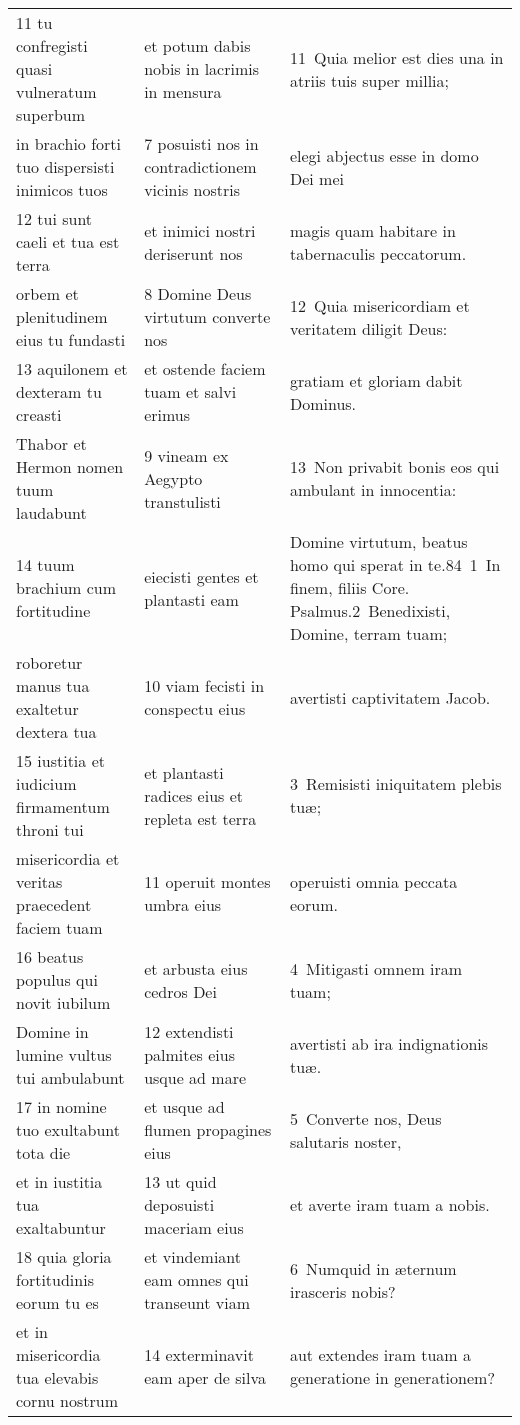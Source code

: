 \documentclass{article}
\begin{document}
\begin{longtable}{@{}p{}p{}p{}@{}}
11 tu confregisti quasi vulneratum superbum	&	et potum dabis nobis in lacrimis in mensura	&	11 Quia melior est dies una in atriis tuis super millia;	\\
in brachio forti tuo dispersisti inimicos tuos	&	7 posuisti nos in contradictionem vicinis nostris	&	elegi abjectus esse in domo Dei mei	\\
12 tui sunt caeli et tua est terra	&	et inimici nostri deriserunt nos	&	magis quam habitare in tabernaculis peccatorum.	\\
orbem et plenitudinem eius tu fundasti	&	8 Domine Deus virtutum converte nos	&	12 Quia misericordiam et veritatem diligit Deus:	\\
13 aquilonem et dexteram tu creasti	&	et ostende faciem tuam et salvi erimus	&	gratiam et gloriam dabit Dominus.	\\
Thabor et Hermon nomen tuum laudabunt	&	9 vineam ex Aegypto transtulisti	&	13 Non privabit bonis eos qui ambulant in innocentia:	\\
14 tuum brachium cum fortitudine	&	eiecisti gentes et plantasti eam	&	Domine virtutum, beatus homo qui sperat in te.84 1 In finem, filiis Core. Psalmus.2 Benedixisti, Domine, terram tuam;	\\
roboretur manus tua exaltetur dextera tua	&	10 viam fecisti in conspectu eius	&	avertisti captivitatem Jacob.	\\
15 iustitia et iudicium firmamentum throni tui	&	et plantasti radices eius et repleta est terra	&	3 Remisisti iniquitatem plebis tuæ;	\\
misericordia et veritas praecedent faciem tuam	&	11 operuit montes umbra eius	&	operuisti omnia peccata eorum.	\\
16 beatus populus qui novit iubilum	&	et arbusta eius cedros Dei	&	4 Mitigasti omnem iram tuam;	\\
Domine in lumine vultus tui ambulabunt	&	12 extendisti palmites eius usque ad mare	&	avertisti ab ira indignationis tuæ.	\\
17 in nomine tuo exultabunt tota die	&	et usque ad flumen propagines eius	&	5 Converte nos, Deus salutaris noster,	\\
et in iustitia tua exaltabuntur	&	13 ut quid deposuisti maceriam eius	&	et averte iram tuam a nobis.	\\
18 quia gloria fortitudinis eorum tu es	&	et vindemiant eam omnes qui transeunt viam	&	6 Numquid in æternum irasceris nobis?	\\
et in misericordia tua elevabis cornu nostrum	&	14 exterminavit eam aper de silva	&	aut extendes iram tuam a generatione in generationem?	\\

\end{longtable}
\end{document}

